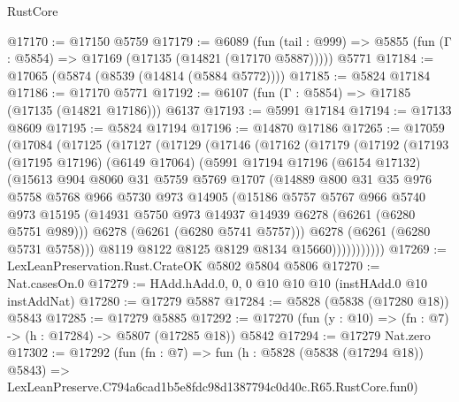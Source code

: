 \begin{lexlean}{RustCore}
\begin{coremodule}
@17170 := @17150 @5759
@17179 := @6089
    (fun (tail : @999) => @5855 (fun (Γ : @5854) => @17169 (@17135 (@14821 (@17170 @5887)))))
    @5771
@17184 := @17065 (@5874 (@8539 (@14814 (@5884 @5772))))
@17185 := @5824 @17184
@17186 := @17170 @5771
@17192 := @6107 (fun (Γ : @5854) => @17185 (@17135 (@14821 @17186))) @6137
@17193 := @5991 @17184
@17194 := @17133 @8609
@17195 := @5824 @17194
@17196 := @14870 @17186
@17265 := @17059
    (@17084
      (@17125
        (@17127
          (@17129
            (@17146
              (@17162
                (@17179
                  (@17192
                    (@17193
                      (@17195 @17196)
                      (@6149 @17064)
                      (@5991
                        @17194
                        @17196
                        (@6154 @17132)
                        (@15613
                          @904
                          @8060
                          @31
                          @5759
                          @5769
                          @1707
                          (@14889
                            @800
                            @31
                            @35
                            @976
                            @5758
                            @5768
                            @966
                            @5730
                            @973
                            @14905
                            (@15186
                              @5757
                              @5767
                              @966
                              @5740
                              @973
                              @15195
                              (@14931 @5750 @973 @14937 @14939 @6278 (@6261 (@6280 @5751 @989)))
                              @6278
                              (@6261 (@6280 @5741 @5757)))
                            @6278
                            (@6261 (@6280 @5731 @5758)))
                          @8119
                          @8122
                          @8125
                          @8129
                          @8134
                          @15660)))))))))))
@17269 := LexLeanPreservation.Rust.CrateOK @5802 @5804 @5806
@17270 := Nat.casesOn.{0}
@17279 := HAdd.hAdd.{0, 0, 0} @10 @10 @10 (instHAdd.{0} @10 instAddNat)
@17280 := @17279 @5887
@17284 := @5828 (@5838 (@17280 @18)) @5843
@17285 := @17279 @5885
@17292 := @17270 (fun (y : @10) => (fn : @7) -> (h : @17284) -> @5807 (@17285 @18)) @5842
@17294 := @17279 Nat.zero
@17302 := @17292
    (fun (fn : @7) =>
    fun (h : @5828 (@5838 (@17294 @18)) @5843) =>
    LexLeanPreserve.C794a6cad1b5e8fdc98d1387794c0d40c.R65.RustCore.fun0)

\end{coremodule}
\end{lexlean}
